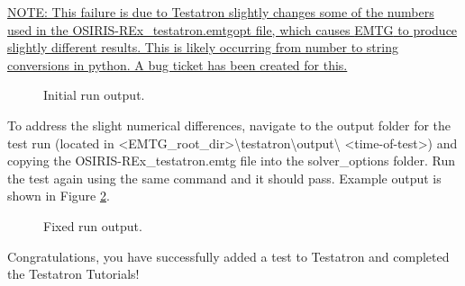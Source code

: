 \documentclass[11pt]{article}
\makeatletter
\newcommand{\knownissuelabel}[2]
{
	 \phantomsection
  	\hyperref[#2_h]{#1}\def\@currentlabel{\unexpanded{#1}}\label{#2_b}
}
\makeatother
\begin{document}
\noindent\knownissuelabel{NOTE: This failure is due to Testatron slightly changes some of the numbers used in the OSIRIS-REx\_testatron.emtgopt file, which causes \ac{EMTG} to produce slightly different results. This is likely occurring from number to string conversions in python. A bug ticket has been created for this.}{testatron_changes_emtgopt_issue}

\begin{figure}[H]
	\centering
	\caption{\label{fig:osiris_testatron_initial_run}Initial run output.}
\end{figure}

\noindent To address the slight numerical differences, navigate to the output folder for the test run (located in \textless EMTG\_root\_dir\textgreater\textbackslash testatron\textbackslash output\textbackslash{} \textless time-of-test\textgreater) and copying the OSIRIS-REx\_testatron.emtg file into the solver\_options folder. Run the test again using the same command and it should pass. Example output is shown in Figure \ref{fig:osiris_testatron_success}.

\begin{figure}[H]
	\centering
	\caption{\label{fig:osiris_testatron_success}Fixed run output.}
\end{figure}

\noindent Congratulations, you have successfully added a test to Testatron and completed the Testatron Tutorials!
\end{document}
